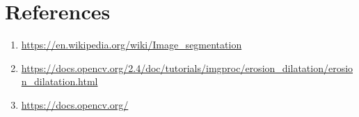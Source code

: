 \documentclass[12pt]{article}
\begin{document}
\newpage

\section{References}

\begin{enumerate}
\item \url{https://en.wikipedia.org/wiki/Image\_segmentation}
\item
\url{https://docs.opencv.org/2.4/doc/tutorials/imgproc/erosion_dilatation/erosion_dilatation.html}
\item
\url{https://docs.opencv.org/}

\end{enumerate}
\end{document}
